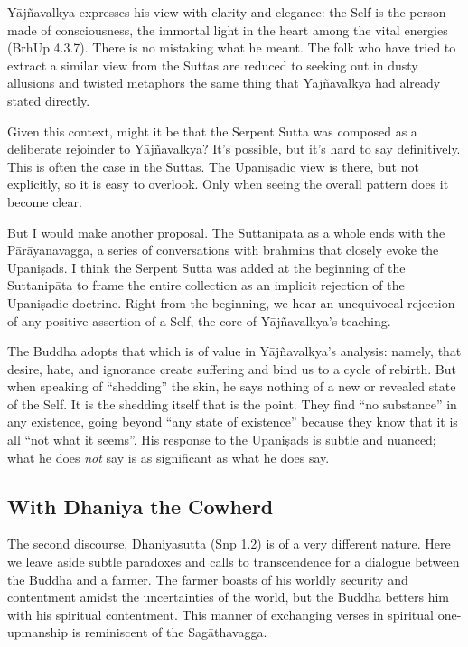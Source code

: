 \documentclass[12pt,openany]{book}%
\begin{document}
\textsanskrit{Yājñavalkya} expresses his view with clarity and elegance: the Self is the person made of consciousness, the immortal light in the heart among the vital energies (BrhUp 4.3.7). There is no mistaking what he meant. The folk who have tried to extract a similar view from the Suttas are reduced to seeking out in dusty allusions and twisted metaphors the same thing that \textsanskrit{Yājñavalkya} had already stated directly.

Given this context, might it be that the Serpent Sutta was composed as a deliberate rejoinder to \textsanskrit{Yājñavalkya}? It’s possible, but it’s hard to say definitively. This is often the case in the Suttas. The \textsanskrit{Upaniṣadic} view is there, but not explicitly, so it is easy to overlook. Only when seeing the overall pattern does it become clear.

But I would make another proposal. The \textsanskrit{Suttanipāta} as a whole ends with the \textsanskrit{Pārāyanavagga}, a series of conversations with brahmins that closely evoke the \textsanskrit{Upaniṣads}. I think the Serpent Sutta was added at the beginning of the \textsanskrit{Suttanipāta} to frame the entire collection as an implicit rejection of the \textsanskrit{Upaniṣadic} doctrine. Right from the beginning, we hear an unequivocal rejection of any positive assertion of a Self, the core of \textsanskrit{Yājñavalkya}’s teaching.

The Buddha adopts that which is of value in \textsanskrit{Yājñavalkya}’s analysis: namely, that desire, hate, and ignorance create suffering and bind us to a cycle of rebirth. But when speaking of “shedding” the skin, he says nothing of a new or revealed state of the Self. It is the shedding itself that is the point. They find “no substance” in any existence, going beyond “any state of existence” because they know that it is all “not what it seems”. His response to the \textsanskrit{Upaniṣads} is subtle and nuanced; what he does \emph{not} say is as significant as what he does say.

\subsection*{With Dhaniya the Cowherd}

The second discourse, Dhaniyasutta (Snp 1.2) is of a very different nature. Here we leave aside subtle paradoxes and calls to transcendence for a dialogue between the Buddha and a farmer. The farmer boasts of his worldly security and contentment amidst the uncertainties of the world, but the Buddha betters him with his spiritual contentment. This manner of exchanging verses in spiritual one-upmanship is reminiscent of the \textsanskrit{Sagāthavagga}.
\end{document}
